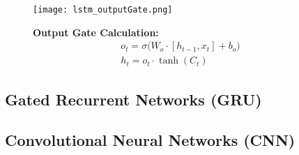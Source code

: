 \begin{figure}
  \centering
  \texttt{[image: lstm\_outputGate.png]} 
  \caption{\textbf{Output Gate Calculation: } 
  $$\begin{array}{ll}
    o_t = \sigma \Big( W_o \cdot [h_{t-1}, x_t] + b_o \Big) \\
    h_t = o_t \cdot \tanh(C_t)
  \end{array}$$}
\end{figure}
    

\subsection{Gated Recurrent Networks (GRU)}

\subsection{Convolutional Neural Networks (CNN)}